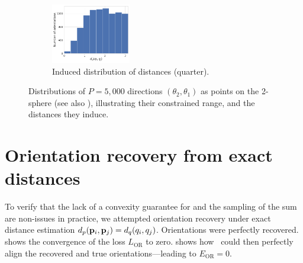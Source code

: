 \begin{figure}[ht!]
\begin{subfigure}[b]{0.22\linewidth}
        \includegraphics[height=7em]{figures/dQ_5a1a_quarter.pdf}
        \caption{Induced distribution of distances (quarter).}
    \end{subfigure}
    \caption{%
        Distributions of $P=5,000$ directions $(\theta_2, \theta_1)$ as points on the 2-sphere (see also ), illustrating their constrained range, and the distances they induce.
        }\label{fig:orientation-constraints}
\end{figure}

\section{Orientation recovery from exact distances}\label{apx:results:orientation-recovery:exact}


To verify that the lack of a convexity guarantee for  and the sampling of the sum are non-issues in practice, we attempted orientation recovery under exact distance estimation $d_p(\mathbf{p}_i, \mathbf{p}_j) = d_q(q_i, q_j)$.
Orientations were perfectly recovered.
 shows the convergence of the loss $L_\text{OR}$ to zero.
 shows how~ could then perfectly align the recovered and true orientations---leading to $E_\text{OR} = 0$.

